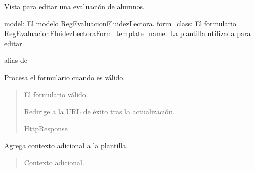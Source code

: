 \documentclass[letterpaper,10pt,spanish]{sphinxmanual}
\begin{document}
\begin{fulllineitems}

\pysigstartsignatures
{}
\pysigstopsignatures
\sphinxAtStartPar
Vista para editar una evaluación de alumnos.
\begin{description}
\sphinxAtStartPar
model: El modelo RegEvaluacionFluidezLectora.
form\_class: El formulario RegEvaluacionFluidezLectoraForm.
template\_name: La plantilla utilizada para editar.

\end{description}


\begin{fulllineitems}

\pysigstartsignatures
{}
\pysigstopsignatures
\sphinxAtStartPar
alias de 

\end{fulllineitems}



\begin{fulllineitems}

\pysigstartsignatures
{}
\pysigstopsignatures
\sphinxAtStartPar
Procesa el formulario cuando es válido.
\begin{quote}\begin{description}
\sphinxAtStartPar
{} \textendash{} El formulario válido.

\sphinxAtStartPar
Redirige a la URL de éxito tras la actualización.

\sphinxAtStartPar
HttpResponse

\end{description}\end{quote}

\end{fulllineitems}



\begin{fulllineitems}

\pysigstartsignatures
{}
\pysigstopsignatures
\sphinxAtStartPar
Agrega contexto adicional a la plantilla.
\begin{quote}\begin{description}
\sphinxAtStartPar
{} \textendash{} Contexto adicional.


\end{description}
\end{quote}
\end{fulllineitems}
\end{fulllineitems}
\end{document}

